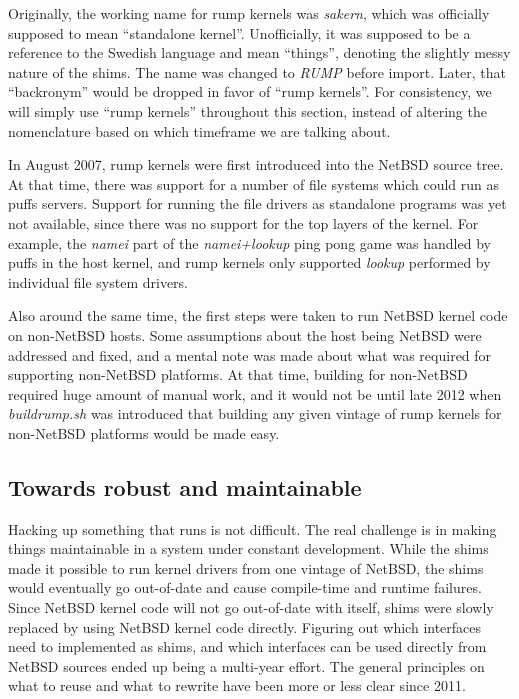 Originally, the working name for rump kernels was \textit{sakern}, which
was officially supposed to mean ``standalone kernel''.  Unofficially, it
was supposed to be a reference to the Swedish language and mean
``things'', denoting the slightly messy nature of the shims.  The name
was changed to \textit{RUMP} before import.  Later, that ``backronym''
would be dropped in favor of ``rump kernels''.  For consistency, we will
simply use ``rump kernels'' throughout this section, instead of altering
the nomenclature based on which timeframe we are talking about.

In August 2007, rump kernels were first introduced into the NetBSD
source tree.  At that time, there was support for a number of file
systems which could run as puffs servers.  Support for running the file
drivers as standalone programs was yet not available, since there was no
support for the top layers of the kernel.  For example, the \textit{namei}
part of the \textit{namei+lookup} ping pong game was handled by puffs
in the host kernel, and rump kernels only supported \textit{lookup}
performed by individual file system drivers.

Also around the same time, the first steps were taken to run NetBSD
kernel code on non-NetBSD hosts.  Some assumptions about the host being
NetBSD were addressed and fixed, and a mental note was made about what was
required for supporting non-NetBSD platforms.  At that time, building for
non-NetBSD required huge amount of manual work, and it would not be until
late 2012 when \textit{buildrump.sh} was introduced that building any
given vintage of rump kernels for non-NetBSD platforms would be made easy.


\subsection{Towards robust and maintainable}

Hacking up something that runs is not difficult.  The real challenge is
in making things maintainable in a system under constant development.
While the shims made it possible to run kernel drivers from one vintage of
NetBSD, the shims would eventually go out-of-date and cause compile-time
and runtime failures.  Since NetBSD kernel code will not go out-of-date
with itself, shims were slowly replaced by using NetBSD kernel code
directly.  Figuring out which interfaces need to implemented as shims,
and which interfaces can be used directly from NetBSD sources ended up
being a multi-year effort.  The general principles on what to reuse and
what to rewrite have been more or less clear since 2011.

